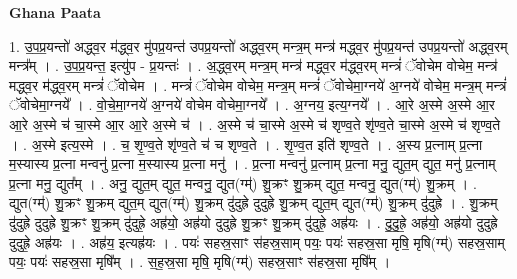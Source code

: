\documentclass[17pt]{extarticle}
\begin{document}
\textbf{Ghana Paata } \newline

1. उ॒प॒प्र॒यन्तो॑ अद्ध्व॒र म॑द्ध्व॒र मु॑पप्र॒यन्त॑ उपप्र॒यन्तो॑ अद्ध्व॒रम् मन्त्र॒म् मन्त्र॑ मद्ध्व॒र मु॑पप्र॒यन्त॑ उपप्र॒यन्तो॑ अद्ध्व॒रम् मन्त्र᳚म् । . उ॒प॒प्र॒यन्त॒ इत्यु॑प - प्र॒यन्तः॑ । . अ॒द्ध्व॒रम् मन्त्र॒म् मन्त्र॑ मद्ध्व॒र म॑द्ध्व॒रम् मन्त्रं॑ ॅवोचेम वोचेम॒ मन्त्र॑ मद्ध्व॒र म॑द्ध्व॒रम् मन्त्रं॑ ॅवोचेम । . मन्त्रं॑ ॅवोचेम वोचेम॒ मन्त्र॒म् मन्त्रं॑ ॅवोचेमा॒ग्नये॑ अ॒ग्नये॑ वोचेम॒ मन्त्र॒म् मन्त्रं॑ ॅवोचेमा॒ग्नये᳚ । . वो॒चे॒मा॒ग्नये॑ अ॒ग्नये॑ वोचेम वोचेमा॒ग्नये᳚ । . अ॒ग्नय॒ इत्य॒ग्नये᳚ । . आ॒रे अ॒स्मे अ॒स्मे आ॒र आ॒रे अ॒स्मे च॑ चा॒स्मे आ॒र आ॒रे अ॒स्मे च॑ । . अ॒स्मे च॑ चा॒स्मे अ॒स्मे च॑ शृण्व॒ते शृ॑ण्व॒ते चा॒स्मे अ॒स्मे च॑ शृण्व॒ते । . अ॒स्मे इत्य॒स्मे । . च॒ शृ॒ण्व॒ते शृ॑ण्व॒ते च॑ च शृण्व॒ते । . शृ॒ण्व॒त इति॑ शृण्व॒ते । . अ॒स्य प्र॒त्नाम् प्र॒त्ना म॒स्यास्य प्र॒त्ना मन्वनु॑ प्र॒त्ना म॒स्यास्य प्र॒त्ना मनु॑ । . प्र॒त्ना मन्वनु॑ प्र॒त्नाम् प्र॒त्ना मनु॒ द्युत॒म् द्युत॒ मनु॑ प्र॒त्नाम् प्र॒त्ना मनु॒ द्युत᳚म् । . अनु॒ द्युत॒म् द्युत॒ मन्वनु॒ द्युत(ग्म्॑) शु॒क्रꣳ शु॒क्रम् द्युत॒ मन्वनु॒ द्युत(ग्म्॑) शु॒क्रम् । . द्युत(ग्म्॑) शु॒क्रꣳ शु॒क्रम् द्युत॒म् द्युत(ग्म्॑) शु॒क्रम् दु॑दुह्रे दुदुह्रे शु॒क्रम् द्युत॒म् द्युत(ग्म्॑) शु॒क्रम् दु॑दुह्रे । . शु॒क्रम् दु॑दुह्रे दुदुह्रे शु॒क्रꣳ शु॒क्रम् दु॑दुह्रे॒ अह्र॑यो॒ अह्र॑यो दुदुह्रे शु॒क्रꣳ शु॒क्रम् दु॑दुह्रे॒ अह्र॑यः । . दु॒दु॒ह्रे॒ अह्र॑यो॒ अह्र॑यो दुदुह्रे दुदुह्रे॒ अह्र॑यः । . अह्र॑य॒ इत्यह्र॑यः । . पयः॑ सहस्र॒साꣳ स॑हस्र॒साम् पयः॒ पयः॑ सहस्र॒सा मृषि॒ मृषि(ग्म्॑) सहस्र॒साम् पयः॒ पयः॑ सहस्र॒सा मृषि᳚म् । . स॒ह॒स्र॒सा मृषि॒ मृषि(ग्म्॑) सहस्र॒साꣳ स॑हस्र॒सा मृषि᳚म् । \newline
\end{document}
